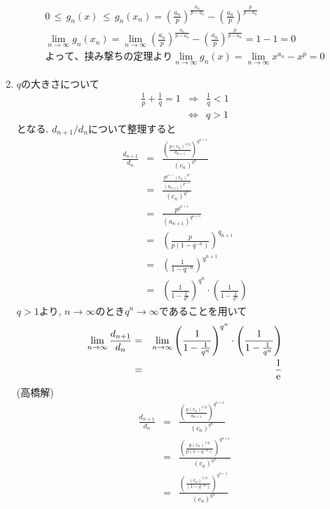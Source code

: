 \documentclass[dvipdfmx,titlepage, 11pt, a4paper]{jsarticle}%
\begin{document}
\begin{enumerate}[(1)]
\begin{eqnarray*}
			0\, \leq\, g_n(x)\, \leq\, g_n(x_n) = \left(\frac{a_n}{p}\right)^{\frac{a_n}{p - a_n}} - \left(\frac{a_n}{p}\right)^{\frac{p}{p - a_n}}\\
			\lim_{n\to \infty}g_n(x_n) = \lim_{n\to \infty}\left(\frac{a_n}{p}\right)^{\frac{a_n}{p - a_n}} - \left(\frac{a_n}{p}\right)^{\frac{p}{p - a_n}} = 1 - 1 = 0\\
			よって、挟み撃ちの定理より
			\lim_{n\to \infty}g_{n}(x) = \lim_{n\to \infty}x^{a_n} - x^{p} = 0
		  \end{eqnarray*}
	\item $q$の大きさについて
	      \begin{eqnarray*}
		      \frac{1}{p}+\frac{1}{q}=1&\Longrightarrow& \frac{1}{q}<1\\
		      &\Longleftrightarrow& q>1
	      \end{eqnarray*}
	      となる. $d_{n+1}/d_{n}$について整理すると
	      \begin{eqnarray*}
		      \frac{d_{n+1}}{d_{n}}&=&\frac{\displaystyle \left(\frac{p(c_{n})^{1/q}}{a_{n+1}}\right)^{q^{n+1}}}{(c_{n})^{q^{n}}}\\
		      &=&\frac{\displaystyle \frac{p^{q^{n+1}}(c_{n})^{q^{n}}}{(a_{n+1})^{q^{n+1}}}}{(c_{n})^{q^{n}}}\\
		      &=&\frac{p^{q^{n+1}}}{(a_{n+1})^{q^{n+1}}}\\
		      &=&\left(\frac{p}{p(1-q^{-n})}\right)^{q_{n+1}}\\
		      &=&\left(\frac{1}{1-q^{-n}}\right)^{q^{n+1}}\\
		      &=&\left(\frac{1}{1-\frac{1}{q^{n}}}\right)^{q^{n}}\cdot \left(\frac{1}{1-\frac{1}{q^{n}}}\right)
	      \end{eqnarray*}
	      $q>1$より, $n\to \infty$のとき$q^{n}\to \infty$であることを用いて
	      \begin{eqnarray*}
		      \lim_{n\to \infty}\frac{d_{n+1}}{d_{n}}&=&\lim_{n\to \infty}\left(\frac{1}{1-\frac{1}{q^{n}}}\right)^{q^{n}}\cdot \left(\frac{1}{1-\frac{1}{q^{n}}}\right)\\
		      &=& \frac{1}{\rm e}
		  \end{eqnarray*}
		  (高橋解)
		  \begin{eqnarray*}
			  \frac{d_{n + 1}}{d_{n}}&=&\frac{\displaystyle \left(\frac{p(c_{n})^{1/q}}{a_{n+1}}\right)^{q^{n+1}}}{(c_{n})^{q^{n}}}\\
			  &=&\frac{\displaystyle \left(\frac{p(c_{n})^{1/q}}{p(1 - q^{-n})}\right)^{q^{n+1}}}{(c_{n})^{q^{n}}}\\
			  &=&\frac{\displaystyle \left(\frac{(c_{n})^{1/q}}{(1 - q^{-n})}\right)^{q^{n+1}}}{(c_{n})^{q^{n}}}\\

\end{eqnarray*}
\end{enumerate}
\end{document}
